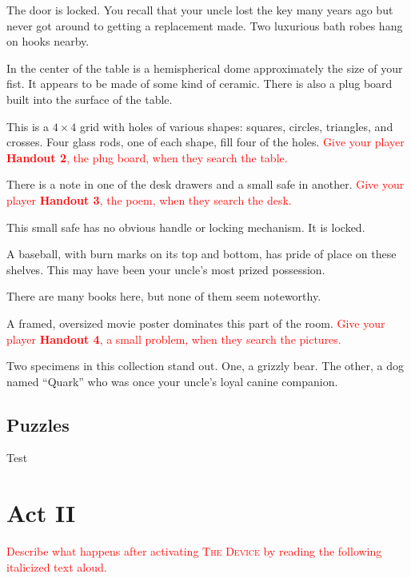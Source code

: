 \documentclass[a6paper, parskip=half, DIV=14, 12pt]{scrartcl}
\begin{document}
\begin{description}[leftmargin=0pt]
\item[Door (E)] The door is locked. You recall that your uncle lost the key many years ago but never got around to getting a replacement made. Two luxurious bath robes hang on hooks nearby.%
\item[Table (C)] In the center of the table is a hemispherical dome approximately the size of your fist. It appears to be made of some kind of ceramic.
There is also a plug board built into the surface of the table.
\item[Plug Board (C)] This is a $4 \times 4$ grid with holes of various shapes: squares, circles, triangles, and crosses. Four glass rods, one of each shape, fill four of the holes. \textcolor{Red}{Give your player \textbf{Handout 2}, the plug board, when they search the table.}
\item[Desk (W)] There is a note in one of the desk drawers and a small safe in another. \textcolor{Red}{Give your player \textbf{Handout 3}, the poem, when they search the desk.}
\item[Safe (W)] This small safe has no obvious handle or locking mechanism. It is locked.
\item[Shelves (NW)] A baseball, with burn marks on its top and bottom, has pride of place on these shelves. This may have been your uncle's most prized possession.
\item[Bookcases (NE)] There are many books here, but none of them seem noteworthy.
\item[Pictures (SE)] A framed, oversized movie poster dominates this part of the room. \textcolor{Red}{Give your player \textbf{Handout 4}, a small problem, when they search the pictures.}
\item[Animals (SW)] Two specimens in this collection stand out. One, a grizzly bear. The other, a dog named ``Quark'' who was once your uncle's loyal canine companion.
\end{description}

\subsection*{Puzzles}
Test

\newpage

\section*{Act II}
\textcolor{Red}{Describe what happens after activating \textsc{The Device} by reading the following italicized text aloud.}
\end{document}
